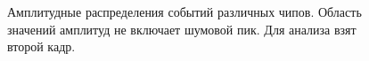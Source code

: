 \documentclass[12pt]{article}
\begin{document}
\begin{figure}[t]
\begin{subfigure}[t]{0.45\textwidth}
	\end{subfigure}
	\caption{Амплитудные распределения событий различных чипов. Область значений амплитуд не включает шумовой пик. Для анализа взят второй кадр.}
	\label{fig:h_sig}
\end{figure}

\vfill
\end{document}
